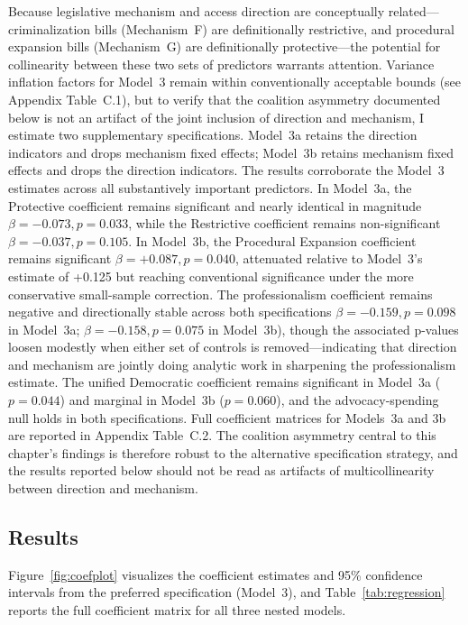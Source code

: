 Because legislative mechanism and access direction are conceptually related---criminalization bills (Mechanism~F) are definitionally restrictive, and procedural expansion bills (Mechanism~G) are definitionally protective---the potential for collinearity between these two sets of predictors warrants attention. Variance inflation factors for Model~3 remain within conventionally acceptable bounds (see Appendix Table~C.1), but to verify that the coalition asymmetry documented below is not an artifact of the joint inclusion of direction and mechanism, I estimate two supplementary specifications. Model~3a retains the direction indicators and drops mechanism fixed effects; Model~3b retains mechanism fixed effects and drops the direction indicators. The results corroborate the Model~3 estimates across all substantively important predictors. In Model~3a, the Protective coefficient remains significant and nearly identical in magnitude $\beta = -0.073, p = 0.033$, while the Restrictive coefficient remains non-significant $\beta = -0.037, p = 0.105$. In Model~3b, the Procedural Expansion coefficient remains significant $\beta = +0.087, p = 0.040$, attenuated relative to Model~3's estimate of +0.125 but reaching conventional significance under the more conservative small-sample correction. The professionalism coefficient remains negative and directionally stable across both specifications $\beta = -0.159, p = 0.098$ in Model~3a; $\beta = -0.158, p = 0.075$ in Model~3b), though the associated p-values loosen modestly when either set of controls is removed---indicating that direction and mechanism are jointly doing analytic work in sharpening the professionalism estimate. The unified Democratic coefficient remains significant in Model~3a ($p=0.044$) and marginal in Model~3b ($p=0.060$), and the advocacy-spending null holds in both specifications. Full coefficient matrices for Models~3a and 3b are reported in Appendix Table~C.2. The coalition asymmetry central to this chapter's findings is therefore robust to the alternative specification strategy, and the results reported below should not be read as artifacts of multicollinearity between direction and mechanism.
% 

\subsection{Results}
\label{sec:reg_results}
Figure~{\ref{fig:coefplot}} visualizes the coefficient estimates and 95\% confidence intervals from the preferred specification (Model~3), and Table~{\ref{tab:regression}} reports the full coefficient matrix for all three nested models.

